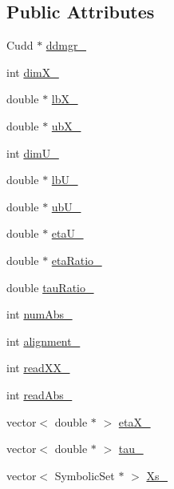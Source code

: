\subsection*{Public Attributes}
\begin{DoxyCompactItemize}
\item 
Cudd $\ast$ \hyperlink{classscots_1_1Adaptive_a9e6666734880dba708dd931348041274}{ddmgr\+\_\+}
\item 
int \hyperlink{classscots_1_1Adaptive_a852e87d359ae3c0fe13493bac80f35f6}{dim\+X\+\_\+}
\item 
double $\ast$ \hyperlink{classscots_1_1Adaptive_a6018fcd45bd81cc0073f0bd1f375829d}{lb\+X\+\_\+}
\item 
double $\ast$ \hyperlink{classscots_1_1Adaptive_ac50c58c4495d727acdb321a0b995426b}{ub\+X\+\_\+}
\item 
int \hyperlink{classscots_1_1Adaptive_ac26b29e9c729fd641af851f87e2ee2b4}{dim\+U\+\_\+}
\item 
double $\ast$ \hyperlink{classscots_1_1Adaptive_aebaf5b4abaa33f4494491cbe67b42b80}{lb\+U\+\_\+}
\item 
double $\ast$ \hyperlink{classscots_1_1Adaptive_aa5c0bc8b175609073aa1f26ad6a83f1c}{ub\+U\+\_\+}
\item 
double $\ast$ \hyperlink{classscots_1_1Adaptive_acc2e430a31aa9ceb8ab6593a9eb3e91f}{eta\+U\+\_\+}
\item 
double $\ast$ \hyperlink{classscots_1_1Adaptive_af0ae9692bf76a9d38cca670e9535310f}{eta\+Ratio\+\_\+}
\item 
double \hyperlink{classscots_1_1Adaptive_a33592a853774854552908de4762f8f8c}{tau\+Ratio\+\_\+}
\item 
int \hyperlink{classscots_1_1Adaptive_afdd5a499494efeb8538346ad9e0f329c}{num\+Abs\+\_\+}
\item 
int \hyperlink{classscots_1_1Adaptive_ad4f525a5a65b284da14369a54532cf39}{alignment\+\_\+}
\item 
int \hyperlink{classscots_1_1Adaptive_a95926f102459b6ec3525040c791ff359}{read\+X\+X\+\_\+}
\item 
int \hyperlink{classscots_1_1Adaptive_a8c2a7e89feeb75f0b51fdf9c8d1359e7}{read\+Abs\+\_\+}
\item 
vector$<$ double $\ast$ $>$ \hyperlink{classscots_1_1Adaptive_abe9d5faea4bd01753070599200e224c5}{eta\+X\+\_\+}
\item 
vector$<$ double $\ast$ $>$ \hyperlink{classscots_1_1Adaptive_a2276dbf06b4db12739aed70443c1a32d}{tau\+\_\+}
\item 
vector$<$ Symbolic\+Set $\ast$ $>$ \hyperlink{classscots_1_1Adaptive_ae43471177bc6b7d3229a9497b46ee343}{Xs\+\_\+}

\end{DoxyCompactItemize}
